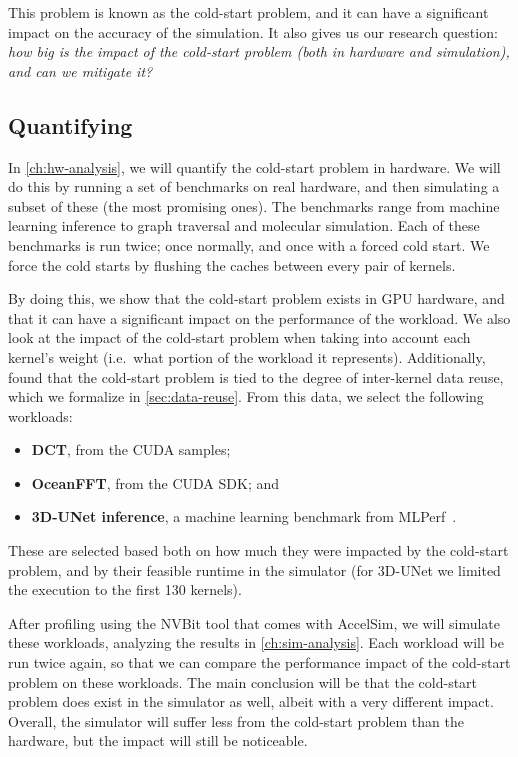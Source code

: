 This problem is known as the cold-start problem, and it can have a significant impact on the accuracy of the simulation.
It also gives us our research question: \textit{how big is the impact of the cold-start problem (both in hardware and simulation), and can we mitigate it?}

\subsection{Quantifying}\label{subsec:quantifying}
In \cref{ch:hw-analysis}, we will quantify the cold-start problem in hardware.
We will do this by running a set of benchmarks on real hardware, and then simulating a subset of these (the most promising ones).
The benchmarks range from machine learning inference to graph traversal and molecular simulation.
Each of these benchmarks is run twice; once normally, and once with a forced cold start.
We force the cold starts by flushing the caches between every pair of kernels.

By doing this, we show that the cold-start problem exists in GPU hardware, and that it can have a significant impact on the performance of the workload.
We also look at the impact of the cold-start problem when taking into account each kernel's weight (i.e.\ what portion of the workload it represents).
Additionally, found that the cold-start problem is tied to the degree of inter-kernel data reuse, which we formalize in \cref{sec:data-reuse}.
From this data, we select the following workloads:
\begin{itemize}
    \item \textbf{DCT}, from the CUDA samples;
    \item \textbf{OceanFFT}, from the CUDA SDK; and
    \item \textbf{3D-UNet inference}, a machine learning benchmark from MLPerf~\cite{mlperf}.
\end{itemize}
These are selected based both on how much they were impacted by the cold-start problem, and by their feasible runtime in the simulator (for 3D-UNet we limited the execution to the first 130 kernels).

After profiling using the NVBit tool that comes with AccelSim, we will simulate these workloads, analyzing the results in \cref{ch:sim-analysis}.
Each workload will be run twice again, so that we can compare the performance impact of the cold-start problem on these workloads.
The main conclusion will be that the cold-start problem does exist in the simulator as well, albeit with a very different impact.
Overall, the simulator will suffer less from the cold-start problem than the hardware, but the impact will still be noticeable.

